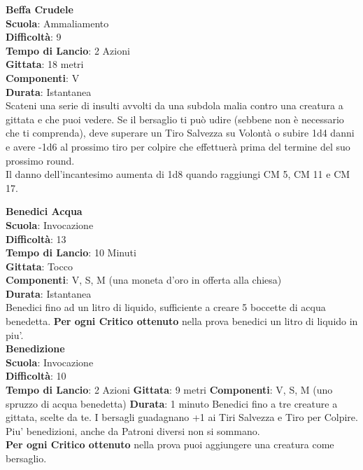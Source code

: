 \begin{multicols}{2}
\medskip\textbf{Beffa Crudele}\\
\textbf{Scuola}: Ammaliamento\\
\textbf{Difficoltà}:  9\\
\textbf{Tempo di Lancio}: 2 Azioni\\
\textbf{Gittata}: 18 metri\\
\textbf{Componenti}: V\\
\textbf{Durata}: Istantanea\\
Scateni una serie di insulti avvolti da una subdola malia contro una creatura a gittata e che puoi vedere. Se il bersaglio ti può udire (sebbene non è necessario che ti comprenda), deve superare un Tiro Salvezza su Volontà o subire 1d4 danni e avere -1d6 al prossimo tiro per colpire che effettuerà prima del termine del suo prossimo round.\\
Il danno dell'incantesimo aumenta di 1d8 quando raggiungi CM 5, CM 11 e CM 17.

\medskip\textbf{Benedici Acqua}\\
\textbf{Scuola}: Invocazione\\
\textbf{Difficoltà}:  13\\
\textbf{Tempo di Lancio}: 10 Minuti\\
\textbf{Gittata}: Tocco\\
\textbf{Componenti}: V, S, M (una moneta d'oro in offerta alla chiesa)\\
\textbf{Durata}: Istantanea\\
Benedici fino ad un litro di liquido, sufficiente a creare 5 boccette di acqua benedetta.
\textbf{Per ogni Critico ottenuto} nella prova benedici un litro di liquido in piu'.\\

\medskip\textbf{Benedizione}\\
\textbf{Scuola}: Invocazione\\
\textbf{Difficoltà}:  10\\
\textbf{Tempo di Lancio}: 2 Azioni
\textbf{Gittata}: 9 metri
\textbf{Componenti}: V, S, M (uno spruzzo di acqua benedetta)
\textbf{Durata}: 1 minuto
Benedici fino a tre creature a gittata, scelte da te. I bersagli guadagnano +1 ai Tiri Salvezza e Tiro per Colpire.\\
Piu' benedizioni, anche da Patroni diversi non si sommano.\\
\textbf{Per ogni Critico ottenuto} nella prova puoi aggiungere una creatura come bersaglio.


\end{multicols}

